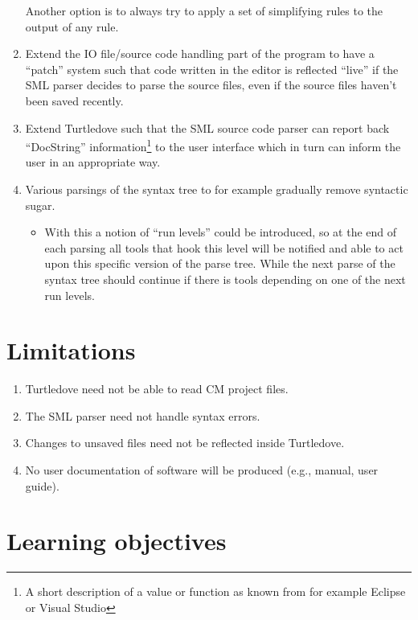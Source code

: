 \documentclass[a4paper,oneside]{article}
\begin{document}
\begin{enumerate}
  Another option is to always try to apply a set of simplifying rules to the output of any rule.

\item Extend the IO file/source code handling part of the program to have a ``patch'' system such
  that code written in the editor is reflected ``live'' if the SML parser decides to parse the
  source files, even if the source files haven't been saved recently.

\item Extend Turtledove such that the SML source code parser can report back ``DocString''
  information\footnote{A short description of a value or function as known from for example Eclipse
    or Visual Studio} to the user interface which in turn can inform the user in an appropriate way.

\item Various parsings of the syntax tree to for example gradually remove syntactic sugar.
  \begin{itemize}
  \item With this a notion of ``run levels'' could be introduced, so at the end of each parsing all
    tools that hook this level will be notified and able to act upon this specific version of the
    parse tree. While the next parse of the syntax tree should continue if there is tools depending
    on one of the next run levels.
  \end{itemize}
\end{enumerate}

\section{Limitations}

\begin{enumerate}
\item Turtledove need not be able to read CM project files.

\item The SML parser need not handle syntax errors.

\item Changes to unsaved files need not be reflected inside Turtledove.

\item No user documentation of software will be produced (e.g., manual, user guide).
\end{enumerate}

\section{Learning objectives}
\end{document}

